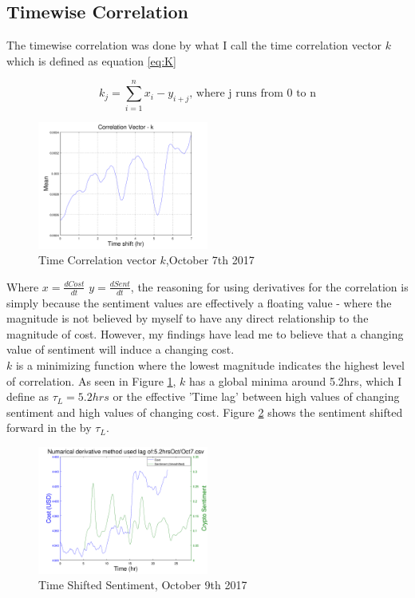 \documentclass[12pt,journal,compsoc]{IEEEtran}
\begin{document}
\subsection{Timewise Correlation}
The timewise correlation was done by what I call the time correlation vector $k$ which is defined as equation \ref{eq:K}

\begin{equation}\label{eq:K}
k_j = \sum\limits_{i=1}^n x_i - y_{i+j} \textrm{, where j runs from 0 to n}
\end{equation}

\begin{figure}[h]
	\centering
	\includegraphics[width=0.5\textwidth]{../Datasets/Plots/Oct7_K}
	\caption{Time Correlation vector $k$,October 7th 2017}
	\label{fig:K}
\end{figure}

Where $x = \frac{dCost}{dt}$ $y = \frac{dSent}{dt}$, the reasoning for using derivatives for the correlation is simply because
the sentiment values are effectively a floating value - where the magnitude is not believed by myself to have any direct 
relationship to the magnitude of cost. However, my findings have lead me to believe that a changing value of sentiment
will induce a changing cost.\\

$k$ is a minimizing function where the lowest magnitude indicates the highest level of correlation.
As seen in Figure \ref{fig:K}, $k$ has a global minima around 5.2hrs, which I define as $\tau_L = 5.2hrs$ 
or the effective 'Time lag' between high values of changing sentiment and high values of changing cost. Figure 
\ref{fig:SentShift} shows the sentiment shifted forward in the by $\tau_L$.

\begin{figure}[h]
	\centering
	\includegraphics[width=0.5\textwidth]{../Datasets/Plots/Oct7_CostSen}
	\caption{Time Shifted Sentiment, October 9th 2017}
	\label{fig:SentShift}
\end{figure}
\end{document}
